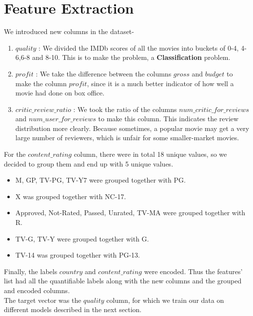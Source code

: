 \documentclass[conference]{IEEEtran}
\begin{document}
\section{Feature Extraction}
We introduced new columns in the dataset-
\begin{enumerate}
	\item $quality$ : We divided the IMDb scores of all the movies into buckets of 0-4, 4-6,6-8 and 8-10. This is to make the problem, a \textbf{Classification} problem.
	\item $profit$ : We take the difference between the columns $gross$ and $budget$ to make the column $profit$, since it is a much better indicator of how well a movie had done on box office.
	\item $critic\_review\_ratio$ : We took the ratio of the columns $num\_critic\_for\_reviews$ and $num\_user\_for\_reviews$ to make this column. This indicates the review distribution more clearly. Because sometimes, a popular movie may get a very large number of reviewers, which is unfair for some smaller-market movies.\\
\end{enumerate}
For the $content\_rating$ column, there were in total 18 unique values, so we decided to group them and end up with 5 unique values.
\begin{itemize}
	\item M, GP, TV-PG, TV-Y7 were grouped together with PG.
	\item X was grouped together with NC-17.
	\item Approved, Not-Rated, Passed, Unrated, TV-MA were grouped together with R.
	\item TV-G, TV-Y were grouped together with G.
	\item TV-14 was grouped together with PG-13.\\
\end{itemize}
Finally, the labels $country$ and $content\_rating$ were encoded.
Thus the features' list had all the quantifiable labels along with the new columns and the grouped and encoded columns.\\
The target vector was the $quality$ column, for which we train our data on different models described in the next section.\\
\end{document}

